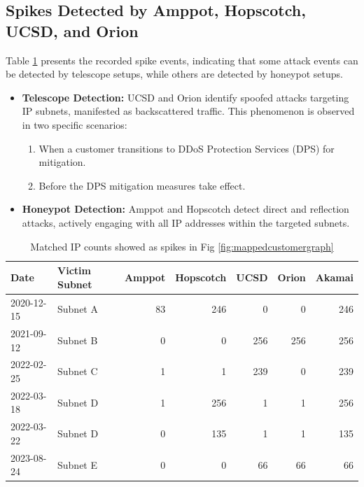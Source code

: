 \subsection{Spikes Detected by Amppot, Hopscotch, UCSD, and Orion}
Table \ref{table:spikes_data} presents the recorded spike events, indicating that some attack events can be detected by telescope setups, while others are detected by honeypot setups.
\begin{itemize}
    \item \textbf{Telescope Detection:} UCSD and Orion identify spoofed attacks targeting IP subnets, manifested as backscattered traffic. This phenomenon is observed in two specific scenarios:
    \begin{enumerate}
        \item When a customer transitions to DDoS Protection Services (DPS) for mitigation.
        \item Before the DPS mitigation measures take effect.
    \end{enumerate}
    
    \item \textbf{Honeypot Detection:} Amppot and Hopscotch detect direct and reflection attacks, actively engaging with all IP addresses within the targeted subnets. 
\end{itemize}


\begin{table}[htbp]
    \centering
    \caption{Matched IP counts showed as spikes in Fig \ref{fig:mappedcustomergraph}}
    \begin{tabular}{|l|l|r|r|r|r|r|}
    \hline
    \textbf{Date} & \textbf{Victim Subnet} & \textbf{Amppot} & \textbf{Hopscotch} & \textbf{UCSD} & \textbf{Orion} & \textbf{Akamai} \\
    \hline
    2020-12-15 & Subnet A & 83 & 246 & 0 & 0 & 246 \\
    2021-09-12 & Subnet B & 0 & 0 & 256 & 256 & 256 \\
    2022-02-25 & Subnet C & 1 & 1 & 239 & 0 & 239 \\
    2022-03-18 & Subnet D & 1 & 256 & 1 & 1 & 256 \\
    2022-03-22 & Subnet D & 0 & 135 & 1 & 1 & 135 \\
    2023-08-24 & Subnet E & 0 & 0 & 66 & 66 & 66 \\
    \hline
    \end{tabular}
    \label{table:spikes_data}
    \end{table}


